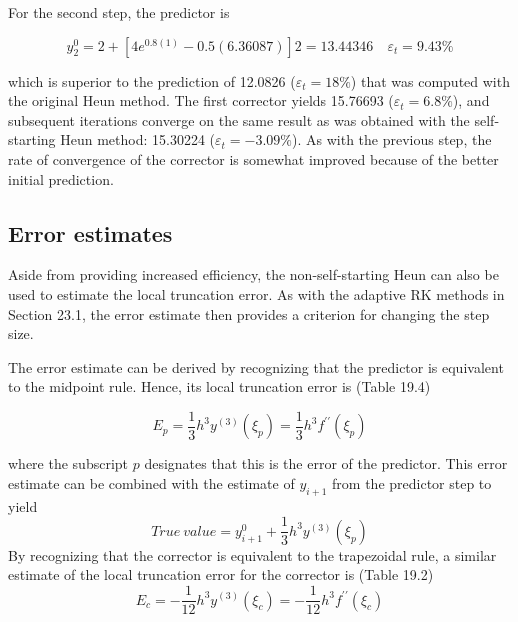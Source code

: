 \documentclass[../main.tex]{subfiles}
\begin{document}
\begin{exmp}
    For the second step, the predictor is

    \begin{equation}
        y_{2}^{0}=2+\left[4 e^{0.8(1)}-0.5(6.36087)\right] 2=13.44346 \quad \varepsilon_{t}=9.43 \% \nonumber
    \end{equation}

    \noindent which is superior to the prediction of 12.0826 ($\varepsilon_{t} = 18\%$) that was computed with the original Heun method. The first corrector yields 15.76693 ($\varepsilon_{t} = 6.8\%$), and subsequent
    iterations converge on the same result as was obtained with the self-starting Heun method:
    15.30224 ($\varepsilon_{t} = -3.09\%$). As with the previous step, the rate of convergence of the corrector is somewhat improved because of the better initial prediction.
\end{exmp}


\subsection{Error estimates}

Aside from providing increased efficiency, the non-self-starting Heun can also be used to
estimate the local truncation error. As with the adaptive RK methods in Section 23.1, the
error estimate then provides a criterion for changing the step size.

The error estimate can be derived by recognizing that the predictor is equivalent to the
midpoint rule. Hence, its local truncation error is (Table 19.4)

\begin{equation}
    \tag{23.10}
    E_{p}=\frac{1}{3} h^{3} y^{(3)}\left(\xi_{p}\right)=\frac{1}{3} h^{3} f^{\prime \prime}\left(\xi_{p}\right)
\end{equation}

\noindent where the subscript $p$ designates that this is the error of the predictor. This error estimate can be combined with the estimate of $y_{i+1}$ from the predictor step to yield
\begin{equation}
    \tag{23.11}
    True\ value =y_{i+1}^{0}+\frac{1}{3} h^{3} y^{(3)}\left(\xi_{p}\right)
\end{equation}
By recognizing that the corrector is equivalent to the trapezoidal rule, a similar estimate of the local truncation error for the corrector is (Table 19.2)
\begin{equation}\tag{23.12}
    E_{c}=-\frac{1}{12} h^{3} y^{(3)}\left(\xi_{c}\right)=-\frac{1}{12} h^{3} f^{\prime \prime}\left(\xi_{c}\right)
\end{equation}
\end{document}
